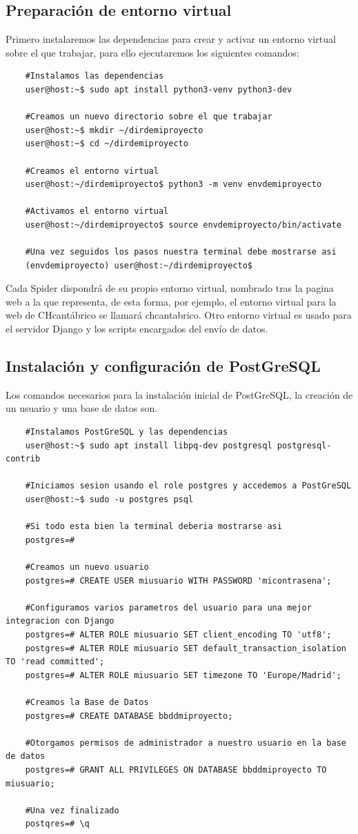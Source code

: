 \subsection{Preparación de entorno virtual}
Primero instalaremos las dependencias para crear y activar un entorno virtual sobre el que trabajar, para ello ejecutaremos los siguientes comandos:

\begin{lstlisting}
	#Instalamos las dependencias
	user@host:~$ sudo apt install python3-venv python3-dev
	
	#Creamos un nuevo directorio sobre el que trabajar
	user@host:~$ mkdir ~/dirdemiproyecto
	user@host:~$ cd ~/dirdemiproyecto
	
	#Creamos el entorno virtual
	user@host:~/dirdemiproyecto$ python3 -m venv envdemiproyecto
	
	#Activamos el entorno virtual
	user@host:~/dirdemiproyecto$ source envdemiproyecto/bin/activate
	
	#Una vez seguidos los pasos nuestra terminal debe mostrarse asi
	(envdemiproyecto) user@host:~/dirdemiproyecto$
\end{lstlisting}

Cada Spider dispondrá de su propio entorno virtual, nombrado tras la pagina web a la que representa, de esta forma, por ejemplo, el entorno virtual para la web de CHcantábrico se llamará chcantabrico. Otro entorno virtual es usado para el servidor Django y los scripts encargados del envío de datos.

\subsection{Instalación y configuración de PostGreSQL}
Los comandos necesarios para la instalación inicial de PostGreSQL, la creación de un usuario y una base de datos son.

\begin{lstlisting}
	#Instalamos PostGreSQL y las dependencias
	user@host:~$ sudo apt install libpq-dev postgresql postgresql-contrib
	
	#Iniciamos sesion usando el role postgres y accedemos a PostGreSQL
	user@host:~$ sudo -u postgres psql
	
	#Si todo esta bien la terminal deberia mostrarse asi
	postgres=# 
	
	#Creamos un nuevo usuario
	postgres=# CREATE USER miusuario WITH PASSWORD 'micontrasena';
	
	#Configuramos varios parametros del usuario para una mejor integracion con Django
	postgres=# ALTER ROLE miusuario SET client_encoding TO 'utf8';
	postgres=# ALTER ROLE miusuario SET default_transaction_isolation TO 'read committed';
	postgres=# ALTER ROLE miusuario SET timezone TO 'Europe/Madrid';
	
	#Creamos la Base de Datos
	postgres=# CREATE DATABASE bbddmiproyecto;
	
	#Otorgamos permisos de administrador a nuestro usuario en la base de datos
	postgres=# GRANT ALL PRIVILEGES ON DATABASE bbddmiproyecto TO miusuario;
	
	#Una vez finalizado
	postqres=# \q
\end{lstlisting}

